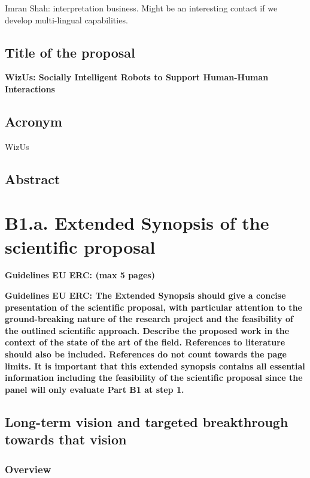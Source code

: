 \documentclass[11pt]{article}
\newcommand{\project}{WizUs\xspace}
\newcommand{\eu}[1]{{\color{teal}\textbf{Guidelines EU ERC: #1}}}
\begin{document}
Imran Shah: interpretation business. Might be an interesting contact if we
develop multi-lingual capabilities.

\subsection*{Title of the proposal}\label{title-of-the-proposal}

\textbf{WizUs: Socially Intelligent Robots to Support Human-Human Interactions}

\subsection*{Acronym}\label{acronym}

\project

\subsection*{Abstract}\label{abstract}

\pagebreak

\section{B1.a. Extended Synopsis of the scientific proposal}\label{part1}
\eu{(max 5 pages)}

\eu{The Extended Synopsis should give a concise presentation of the scientific
proposal, with particular attention to the ground-breaking nature of the
research project and the feasibility of the outlined scientific approach.
Describe the proposed work in the context of the state of the art of the field.
References to literature should also be included. References do not count
towards the page limits. It is important that this extended synopsis contains
all essential information including the feasibility of the scientific proposal
since the panel will only evaluate Part B1 at step 1.}

\subsection{Long-term vision and targeted breakthrough towards that vision}

\subsubsection{Overview}
\end{document}
